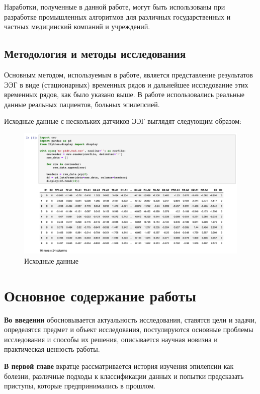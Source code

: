 \documentclass[a4paper,12pt]{report}
\begin{document}
Наработки, полученные в данной работе, могут быть использованы при разработке промышленных алгоритмов для различных государственных и частных медицинский компаний и учреждений.

\section{Методология и методы исследования}

Основным методом, используемым в работе, является представление результатов ЭЭГ в виде (стационарных) временных рядов и дальнейшее исследование этих временных рядов, как было указано выше. В работе использовались реальные данные реальных пациентов, больных эпилепсией.

Исходные данные с нескольких датчиков ЭЭГ выглядят следующим образом:

\begin{figure}[h!]
    \centering
    \includegraphics[scale=0.45]{1.png}
    \caption{Исходные данные}
\end{figure}


\chapter{Основное содержание работы}

\textbf{Во введении} обосновывается актуальность исследования, ставятся цели и задачи, определятся предмет и объект исследования, постулируются основные проблемы исследования и способы их решения, описывается научная новизна и практическая ценность работы.

\textbf{В первой главе} вкратце рассматривается история изучения эпилепсии как болезни, различные подходы к классификации данных и попытки предсказать приступы, которые предпринимались в прошлом.
\end{document}
